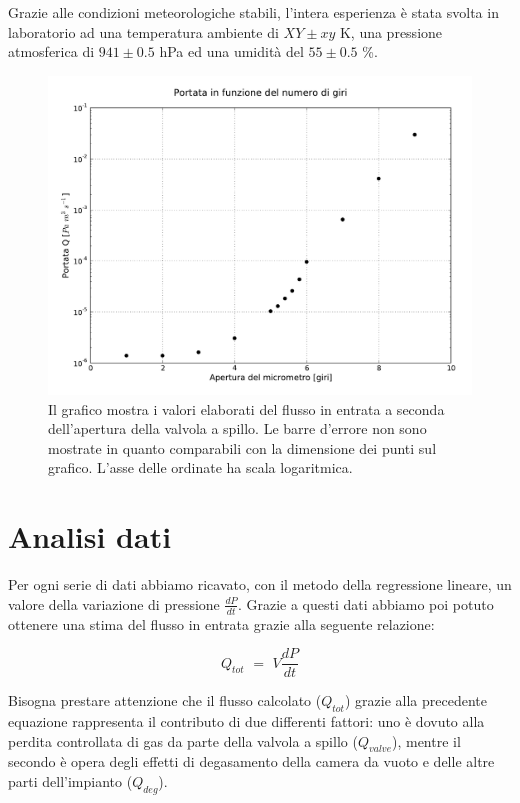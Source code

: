 Grazie alle condizioni meteorologiche stabili, l'intera esperienza è stata svolta in laboratorio ad una temperatura ambiente di $XY \pm xy$ \si{\kelvin}, una pressione atmosferica di $941 \pm 0.5$ hPa ed una umidità del $55 \pm 0.5$ \%.

\begin{figure}[h!]
    \includegraphics[width=15cm]{graph.pdf}
    \caption{Il grafico mostra i valori elaborati del flusso in entrata a seconda dell'apertura della valvola a spillo. Le barre d'errore non sono
    mostrate in quanto comparabili con la dimensione dei punti sul grafico. L'asse delle ordinate ha scala logaritmica.}
    \label{fig:graph}
\end{figure}

\section{Analisi dati}

Per ogni serie di dati abbiamo ricavato, con il metodo della regressione lineare, un valore della variazione di pressione $\frac{dP}{dt}$. Grazie a questi dati abbiamo poi potuto ottenere una stima del flusso in entrata grazie alla seguente relazione:

\begin{equation}
	Q_{tot} \,\, = \,\, V \frac{dP}{dt}
\end{equation}

Bisogna prestare attenzione che il flusso calcolato ($Q_{tot}$) grazie alla precedente equazione rappresenta il contributo di due differenti fattori: uno è dovuto alla perdita controllata di gas da parte della valvola a spillo ($Q_{valve}$), mentre il secondo è opera degli effetti di degasamento della camera da vuoto e delle altre parti dell'impianto ($Q_{deg}$).

